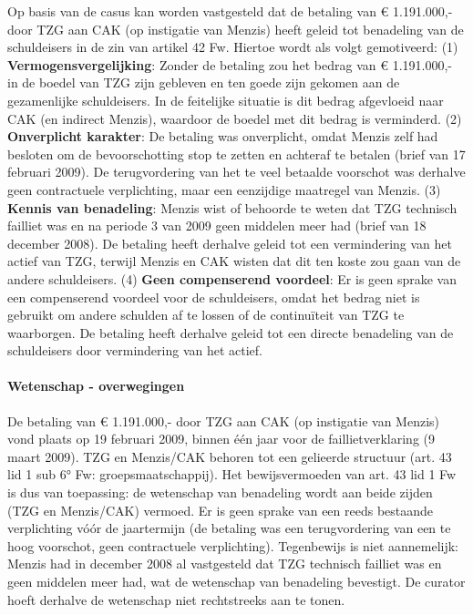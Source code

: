 \documentclass[
  dutch,
  a4paper,
]{article}
\begin{document}
Op basis van de casus kan worden vastgesteld dat de betaling van € 1.191.000,- door TZG aan CAK (op instigatie van Menzis) heeft geleid tot benadeling van de schuldeisers in de zin van artikel 42 Fw. Hiertoe wordt als volgt gemotiveerd: (1) \textbf{Vermogensvergelijking}: Zonder de betaling zou het bedrag van € 1.191.000,- in de boedel van TZG zijn gebleven en ten goede zijn gekomen aan de gezamenlijke schuldeisers. In de feitelijke situatie is dit bedrag afgevloeid naar CAK (en indirect Menzis), waardoor de boedel met dit bedrag is verminderd. (2) \textbf{Onverplicht karakter}: De betaling was onverplicht, omdat Menzis zelf had besloten om de bevoorschotting stop te zetten en achteraf te betalen (brief van 17 februari 2009). De terugvordering van het te veel betaalde voorschot was derhalve geen contractuele verplichting, maar een eenzijdige maatregel van Menzis. (3) \textbf{Kennis van benadeling}: Menzis wist of behoorde te weten dat TZG technisch failliet was en na periode 3 van 2009 geen middelen meer had (brief van 18 december 2008). De betaling heeft derhalve geleid tot een vermindering van het actief van TZG, terwijl Menzis en CAK wisten dat dit ten koste zou gaan van de andere schuldeisers. (4) \textbf{Geen compenserend voordeel}: Er is geen sprake van een compenserend voordeel voor de schuldeisers, omdat het bedrag niet is gebruikt om andere schulden af te lossen of de continuïteit van TZG te waarborgen. De betaling heeft derhalve geleid tot een directe benadeling van de schuldeisers door vermindering van het actief.

\paragraph{Wetenschap - overwegingen}\label{wetenschap---overwegingen-81}

De betaling van € 1.191.000,- door TZG aan CAK (op instigatie van Menzis) vond plaats op 19 februari 2009, binnen één jaar voor de faillietverklaring (9 maart 2009). TZG en Menzis/CAK behoren tot een gelieerde structuur (art. 43 lid 1 sub 6° Fw: groepsmaatschappij). Het bewijsvermoeden van art. 43 lid 1 Fw is dus van toepassing: de wetenschap van benadeling wordt aan beide zijden (TZG en Menzis/CAK) vermoed. Er is geen sprake van een reeds bestaande verplichting vóór de jaartermijn (de betaling was een terugvordering van een te hoog voorschot, geen contractuele verplichting). Tegenbewijs is niet aannemelijk: Menzis had in december 2008 al vastgesteld dat TZG technisch failliet was en geen middelen meer had, wat de wetenschap van benadeling bevestigt. De curator hoeft derhalve de wetenschap niet rechtstreeks aan te tonen.
\end{document}

